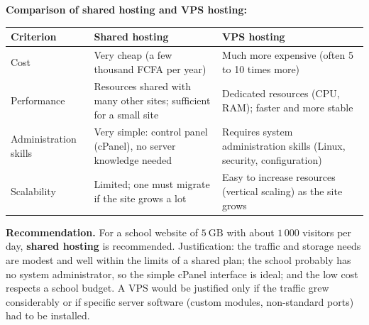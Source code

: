 \documentclass[11pt]{article}
\begin{document}
\begin{corrige}
\textbf{Comparison of shared hosting and VPS hosting:}
\begin{center}
\begin{tabularx}{\linewidth}{|l|X|X|}
\hline
\rowcolor{popblueL} \textbf{Criterion} & \textbf{Shared hosting} & \textbf{VPS hosting} \\
\hline
Cost & Very cheap (a few thousand FCFA per year) & Much more expensive (often 5 to 10 times more) \\
\hline
Performance & Resources shared with many other sites; sufficient for a small site & Dedicated resources (CPU, RAM); faster and more stable \\
\hline
Administration skills & Very simple: control panel (cPanel), no server knowledge needed & Requires system administration skills (Linux, security, configuration) \\
\hline
Scalability & Limited; one must migrate if the site grows a lot & Easy to increase resources (vertical scaling) as the site grows \\
\hline
\end{tabularx}
\end{center}
\textbf{Recommendation.} For a school website of $5\ \mathrm{GB}$ with about $1\,000$ visitors per day, \textbf{shared hosting} is recommended. Justification: the traffic and storage needs are modest and well within the limits of a shared plan; the school probably has no system administrator, so the simple cPanel interface is ideal; and the low cost respects a school budget. A VPS would be justified only if the traffic grew considerably or if specific server software (custom modules, non-standard ports) had to be installed.
\end{corrige}
\end{document}
